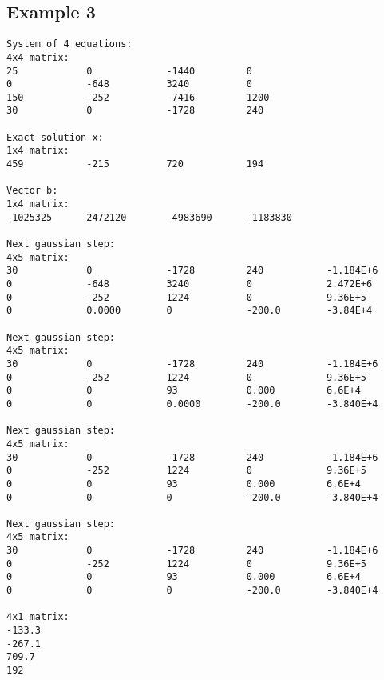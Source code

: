 \documentclass[letterpaper,12pt]{article}
\begin{document}
\subsection{Example 3}
\label{a:E3}
\begin{verbatim}
System of 4 equations:
4x4 matrix:
25            0             -1440         0             
0             -648          3240          0             
150           -252          -7416         1200          
30            0             -1728         240           

Exact solution x:
1x4 matrix:
459           -215          720           194           

Vector b:
1x4 matrix:
-1025325      2472120       -4983690      -1183830      

Next gaussian step:
4x5 matrix:
30            0             -1728         240           -1.184E+6     
0             -648          3240          0             2.472E+6      
0             -252          1224          0             9.36E+5       
0             0.0000        0             -200.0        -3.84E+4      

Next gaussian step:
4x5 matrix:
30            0             -1728         240           -1.184E+6     
0             -252          1224          0             9.36E+5       
0             0             93            0.000         6.6E+4        
0             0             0.0000        -200.0        -3.840E+4     

Next gaussian step:
4x5 matrix:
30            0             -1728         240           -1.184E+6     
0             -252          1224          0             9.36E+5       
0             0             93            0.000         6.6E+4        
0             0             0             -200.0        -3.840E+4     

Next gaussian step:
4x5 matrix:
30            0             -1728         240           -1.184E+6     
0             -252          1224          0             9.36E+5       
0             0             93            0.000         6.6E+4        
0             0             0             -200.0        -3.840E+4     

4x1 matrix:
-133.3        
-267.1        
709.7         
192
\end{verbatim}
\end{document}
